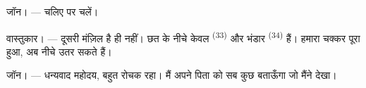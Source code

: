 \textsc{जॉन}। --- चलिए  पर चलें।

\textsc{वास्तुकार}। --- दूसरी मंज़िल है ही नहीं। छत के नीचे केवल
 \textsuperscript{(33)} और भंडार \textsuperscript{(34)} हैं। हमारा
चक्कर पूरा हुआ, अब नीचे उतर सकते हैं।

\textsc{जॉन}। --- धन्यवाद महोदय, बहुत रोचक रहा। मैं अपने पिता को सब कुछ बताऊँगा
जो मैंने देखा।
\VUsaut{4.0mm}
\VUfilet{22mm}
